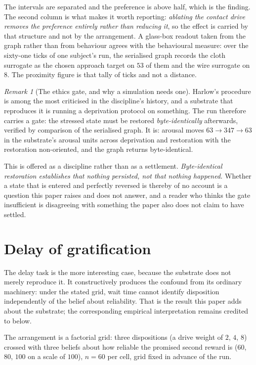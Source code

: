 \documentclass[11pt,a4paper]{article}
\theoremstyle{remark}
\newtheorem{remark}[definition]{Remark}
\begin{document}
The intervals are separated and the preference is above half, which is the finding. The second
column is what makes it worth reporting: \emph{ablating the contact drive removes the preference
entirely rather than reducing it}, so the effect is carried by that structure and not by the
arrangement. A glass-box readout taken from the graph rather than from
behaviour agrees with the behavioural measure: over the sixty-one ticks of one subject's run, the
serialised graph records the cloth surrogate as the chosen approach target on $53$ of them and the
wire surrogate on $8$. The proximity figure is that tally of ticks and not a distance.

\begin{remark}[The ethics gate, and why a simulation needs one]\label{rem:ethics}
Harlow's procedure is among the most criticised in the discipline's history, and a substrate that
reproduces it is running a deprivation protocol on something. The run therefore carries a gate: the
stressed state must be restored \emph{byte-identically} afterwards, verified by comparison of the
serialised graph. It is: arousal moves $63 \rightarrow 347 \rightarrow 63$ in the substrate's
arousal units across deprivation and restoration with the restoration non-oriented, and the graph
returns byte-identical.

This is offered as a discipline rather than as a settlement. \emph{Byte-identical restoration
establishes that nothing persisted, not that nothing happened.} Whether a state that is entered and
perfectly reversed is thereby of no account is a question this paper raises and does not answer, and
a reader who thinks the gate insufficient is disagreeing with something the paper also does not
claim to have settled.
\end{remark}

\section{Delay of gratification}\label{sec:marshmallow}
The delay task is the more interesting case, because the substrate does not merely reproduce it.
It constructively produces the confound from its ordinary machinery: under the stated grid, wait time
cannot identify disposition independently of the belief about reliability. That is the result this
paper adds about the substrate; the corresponding empirical interpretation remains credited to
\citet{kidd2013,watts2018} below.

The arrangement is a factorial grid: three dispositions (a drive weight of $2$, $4$, $8$) crossed
with three beliefs about how reliable the promised second reward is ($60$, $80$, $100$ on a scale of
$100$), $n=60$ per cell, grid fixed in advance of the run.
\end{document}
